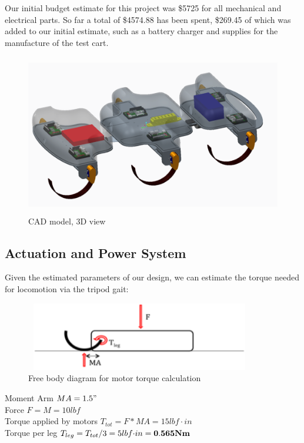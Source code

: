 \documentclass[11pt]{article}
\begin{document}
Our initial budget estimate for this project was \$5725 for all mechanical and electrical parts. So far a total of \$4574.88 has been spent, \$269.45 of which was added to our initial estimate, such as a battery charger and supplies for the manufacture of the test cart. 

\begin{figure}[H]
\centering
\includegraphics[width=14cm,height=7cm]{Xjus1.png}
\caption{CAD model, 3D view}
\end{figure}

\subsection{Actuation and Power System}

Given the estimated parameters of our design, we can estimate the torque needed for locomotion via the tripod gait:

\begin{figure}[H]
\centering
\includegraphics[width=10cm,height=3cm]{torquecalc.png}
\caption{Free body diagram for motor torque calculation}
\end{figure}

\begin{center}
Moment Arm $MA = 1.5"$ \\
Force $F =  M = 10lbf$ \\
Torque applied by motors $T_{tot} = F*MA = 15lbf{\cdot}in$ \\
Torque per leg $T_{leg} = T_{tot}/3 = 5 lbf{\cdot}in = \bf{0.565Nm}$
\end{center}
\end{document}
